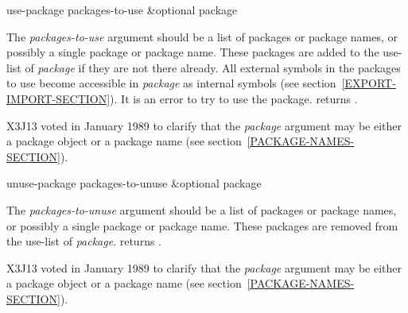 \begin{defun}[Function]
use-package packages-to-use &optional package

The \emph{packages-to-use} argument should be a list of packages or package
names, or possibly a single package or package name.  These packages are
added to the use-list of \emph{package} if they are not there already.  All
external symbols in the packages to use become accessible in \emph{package}
as internal symbols
(see section~\ref{EXPORT-IMPORT-SECTION}).
It is an error to try to use the  package.
 returns {\true}.

\begin{new}
X3J13 voted in January 1989
to clarify that the \emph{package} argument may be either a package object
or a package name (see section~\ref{PACKAGE-NAMES-SECTION}).
\end{new}
\end{defun}

\begin{defun}[Function]
unuse-package packages-to-unuse &optional package

The \emph{packages-to-unuse} argument should be a list of packages or
package names, or possibly a single package or package name.  These
packages are removed from the use-list of \emph{package}.
 returns {\true}.

\begin{new}
X3J13 voted in January 1989
to clarify that the \emph{package} argument may be either a package object
or a package name (see section~\ref{PACKAGE-NAMES-SECTION}).
\end{new}
\end{defun}

